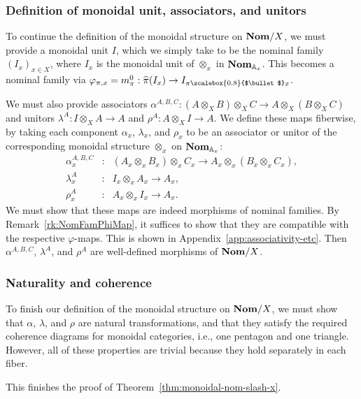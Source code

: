 \documentclass[11pt,a4paper]{amsart}
\theoremstyle{plain}
\theoremstyle{definition}
\theoremstyle{remark}
\newcommand{\Nom}{\textrm{\bf Nom}}
\newcommand{\NomAX}[1]{\Nom_{\aA_{#1}}}
\newcommand{\aA}{\mathbb{A}}
\newcommand{\mm}{m}
\newcommand{\pihat}{\widehat{\pi}}
\let\oldbullet\bullet
\newcommand{\action}{\mathbin{\text{\raisebox{0.15ex}{\scalebox{0.8}{$\oldbullet$}}}}}
\newcommand{\bul}{\action}
\begin{document}
\subsubsection{Definition of monoidal unit, associators, and unitors}
\label{sssec:def-unit-etc}

To continue the definition of the monoidal structure on $\Nom/X$, we
must provide a monoidal unit $I$, which we simply take to be the
nominal family $(I_x)_{x\in X}$, where $I_x$ is the monoidal unit of
$\otimes_x$ in $\NomAX{x}$. This becomes a nominal family via
$\varphi_{\pi,x} = \mm_{\pi}^0 : \pihat(I_x)\to I_{\pi\bul x}$.


We must also provide associators $\alpha^{A,B,C}:(A\otimes_X B)\otimes_X C\to
A\otimes_X(B\otimes_X C)$ and unitors $\lambda^{A}:I\otimes_X A\to A$ and $\rho^{A}:A\otimes_X
I\to A$.  We define these maps fiberwise, by taking each component
$\alpha_x$, $\lambda_x$, and $\rho_x$ to be an associator or unitor of
the corresponding monoidal structure $\otimes_x$ on $\NomAX{x}$:
\[
\begin{array}{lll}
  \alpha^{A,B,C}_{x} &:& (A_x\otimes_x B_x)\otimes_x C_x\to A_x\otimes_x(B_x\otimes_x C_x), \\
  \lambda^{A}_{x} &:& I_x\otimes_x A_x\to A_x,\\
  \rho^{A}_{x} &:& A_x\otimes_x I_x\to A_x.
\end{array}
\]
We must show that these maps are indeed morphisms of nominal
families. By Remark~\ref{rk:NomFamPhiMap}, it suffices to show that
they are compatible with the respective $\varphi$-maps.
This is shown in Appendix~\ref{app:associativity-etc}.
Then $\alpha^{A,B,C}$, $\lambda^{A}$, and
$\rho^{A}$ are well-defined morphisms of $\Nom/X$.

\subsubsection{Naturality and coherence}

To finish our definition of the monoidal structure on $\Nom/X$, we
must show that $\alpha$, $\lambda$, and $\rho$ are natural
transformations, and that they satisfy the required coherence diagrams
for monoidal categories, i.e., one pentagon and one triangle. However,
all of these properties are trivial because they hold separately in
each fiber.

This finishes the proof of Theorem~\ref{thm:monoidal-nom-slash-x}.
\end{document}
